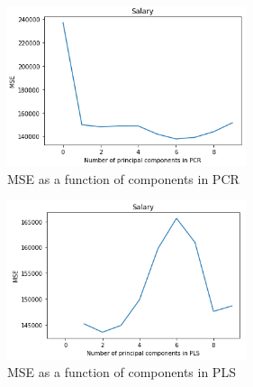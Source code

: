 \begin{figure}[H]
	\centering
	\includegraphics[width=7cm]{Img/MSE_PCR.PNG}
	\caption{MSE as a function of components in PCR}
	\label{fig:MSE_PCR}
\end{figure} 

\begin{figure}[H]
	\centering
	\includegraphics[width=7cm]{Img/MSE_PLS.PNG}
	\caption{MSE as a function of components in PLS}
	\label{fig:MSE_PLS}
\end{figure} 